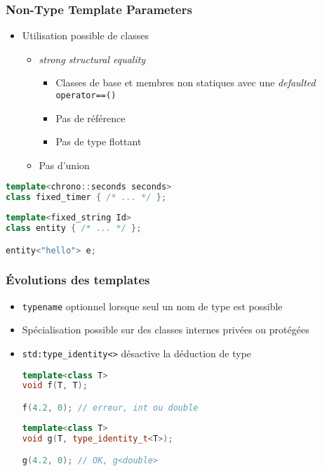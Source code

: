 \documentclass[C++.tex]{subfiles}
\begin{document}
\begin{frame}[fragile]
	\frametitle{Non-Type Template Parameters}
	\begin{itemize}
		\item Utilisation possible de classes
		\begin{itemize}
			\item \textit{strong structural equality}
			\begin{itemize}
				\item Classes de base et membres non statiques avec une \textit{defaulted} \lstinline|operator==()|
				\item Pas de référence
				\item Pas de type flottant
			\end{itemize}
			\item Pas d'union
		\end{itemize}
	\end{itemize}

	\begin{lstlisting}[language=C++]
template<chrono::seconds seconds>
class fixed_timer { /* ... */ };\end{lstlisting}


	\begin{lstlisting}[language=C++]
template<fixed_string Id>
class entity { /* ... */ };

entity<"hello"> e;\end{lstlisting}

\end{frame}

\begin{frame}[fragile]
	\frametitle{Évolutions des templates}
	\begin{itemize}
		\item \lstinline|typename| optionnel lorsque seul un nom de type est possible
		

		\item Spécialisation possible sur des classes internes privées ou protégées
		\item \lstinline|std:type_identity<>| désactive la déduction de type

		\begin{lstlisting}[language=C++]
template<class T>
void f(T, T);

f(4.2, 0); // erreur, int ou double\end{lstlisting}

		\begin{lstlisting}[language=C++]
template<class T>
void g(T, type_identity_t<T>);

g(4.2, 0); // OK, g<double>\end{lstlisting}
	\end{itemize}
\end{frame}
\end{document}
